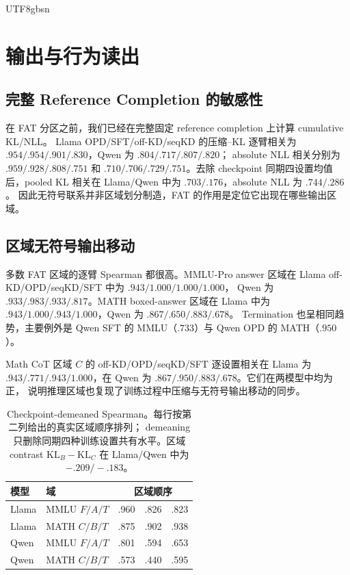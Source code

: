\documentclass[letterpaper]{article} %
\begin{document}
\begin{CJK*}{UTF8}{gbsn}
\section{输出与行为读出}

\subsection{完整 Reference Completion 的敏感性}

在 FAT 分区之前，我们已经在完整固定 reference completion 上计算 cumulative KL/NLL。
Llama OPD/SFT/off-KD/seqKD 的压缩--KL 逐臂相关为
$.954/.954/.901/.830$，Qwen 为 $.804/.717/.807/.820$；
absolute NLL 相关分别为 $.959/.928/.808/.751$ 和
$.710/.706/.729/.751$。去除 checkpoint 同期四设置均值后，pooled KL 相关在
Llama/Qwen 中为 $.703/.176$，absolute NLL 为 $.744/.286$。
因此无符号联系并非区域划分制造，FAT 的作用是定位它出现在哪些输出区域。

\subsection{区域无符号输出移动}

多数 FAT 区域的逐臂 Spearman 都很高。MMLU-Pro answer 区域在
Llama off-KD/OPD/seqKD/SFT 中为 $.943/1.000/1.000/1.000$，
Qwen 为 $.933/.983/.933/.817$。MATH boxed-answer 区域在 Llama 中为
$.943/1.000/.943/1.000$，Qwen 为 $.867/.650/.883/.678$。
Termination 也呈相同趋势，主要例外是 Qwen SFT 的 MMLU（$.733$）与
Qwen OPD 的 MATH（$.950$）。

Math CoT 区域 $C$ 的 off-KD/OPD/seqKD/SFT 逐设置相关在 Llama 为
$.943/.771/.943/1.000$，在 Qwen 为 $.867/.950/.883/.678$。它们在两模型中均为正，
说明推理区域也复现了训练过程中压缩与无符号输出移动的同步。

\begin{table}[t]
\centering
\small
\setlength{\tabcolsep}{3.5pt}
\begin{tabular}{llrrr}
\toprule
模型 & 域 & \multicolumn{3}{c}{区域顺序} \\
\midrule
Llama & MMLU $F/A/T$ & .960 & .826 & .823 \\
Llama & MATH $C/B/T$ & .875 & .902 & .938 \\
Qwen & MMLU $F/A/T$ & .801 & .594 & .653 \\
Qwen & MATH $C/B/T$ & .573 & .440 & .595 \\
\bottomrule
\end{tabular}
\caption{Checkpoint-demeaned Spearman。每行按第二列给出的真实区域顺序排列；
demeaning 只删除同期四种训练设置共有水平。区域 contrast
$\mathrm{KL}_B-\mathrm{KL}_C$ 在 Llama/Qwen 中为 $-.209/-.183$。}
\label{tab:supp-demean}
\end{table}


\end{CJK*}
\end{document}
